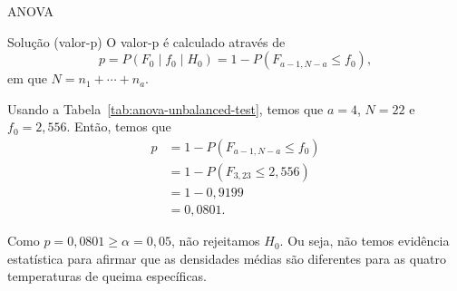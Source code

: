 \documentclass[8pt]{beamer}
\begin{document}
\begin{frame}{ANOVA}


\begin{block}{Solução (valor-p)}
	O valor-p é calculado através de 
	$$p = P\left(F_0 \mid f_0 \mid H_0\right) = 1 - P\left(F_{a-1, N-a} \leq f_0\right),$$
	em que $N = n_1+\cdots + n_a$.
	
	Usando a Tabela~\ref{tab:anova-unbalanced-test}, temos que $a = 4$, $N = 22$ e $f_0 = 2,556$. Então, temos que
	\begin{align*}
	p &= 1 - P\left(F_{a-1, N-a} \leq f_0\right)\\
	&= 1 - P\left( F_{3, 23} \leq  2,556 \right)\\
	&= 1 - 0,9199\\
	&= 0,0801.
	\end{align*}
	
	Como $p=0,0801 \geq \alpha = 0,05$, não rejeitamos $H_0$. Ou seja, não temos evidência estatística para afirmar que as densidades médias são diferentes para as quatro temperaturas de queima específicas.
\end{block}

\end{frame}
\end{document}

